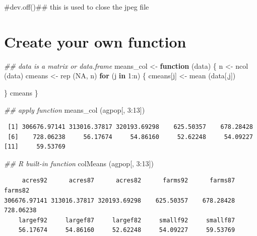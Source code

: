 \documentclass[
  letterpaper,
]{scrbook}
\newenvironment{Shaded}{\begin{snugshade}}{\end{snugshade}}
\newcommand{\CommentTok}[1]{\textcolor[rgb]{0.37,0.37,0.37}{#1}}
\newcommand{\ConstantTok}[1]{\textcolor[rgb]{0.56,0.35,0.01}{#1}}
\newcommand{\ControlFlowTok}[1]{\textcolor[rgb]{0.00,0.23,0.31}{\textbf{#1}}}
\newcommand{\DecValTok}[1]{\textcolor[rgb]{0.68,0.00,0.00}{#1}}
\newcommand{\DocumentationTok}[1]{\textcolor[rgb]{0.37,0.37,0.37}{\textit{#1}}}
\newcommand{\FunctionTok}[1]{\textcolor[rgb]{0.28,0.35,0.67}{#1}}
\newcommand{\NormalTok}[1]{\textcolor[rgb]{0.00,0.23,0.31}{#1}}
\newcommand{\OtherTok}[1]{\textcolor[rgb]{0.00,0.23,0.31}{#1}}
\newcommand{\SpecialCharTok}[1]{\textcolor[rgb]{0.37,0.37,0.37}{#1}}
\begin{document}
\begin{Shaded}
\begin{Highlighting}[]
\CommentTok{\#dev.off()\#\# this is used to close the jpeg file}
\end{Highlighting}
\end{Shaded}

\section{Create your own function}\label{create-your-own-function}

\begin{Shaded}
\begin{Highlighting}[]
\DocumentationTok{\#\# data is a matrix or data.frame}
\NormalTok{means\_col }\OtherTok{\textless{}{-}} \ControlFlowTok{function}\NormalTok{ (data)}
\NormalTok{\{}
\NormalTok{    n }\OtherTok{\textless{}{-}} \FunctionTok{ncol}\NormalTok{ (data)}
\NormalTok{    cmeans }\OtherTok{\textless{}{-}} \FunctionTok{rep}\NormalTok{ (}\ConstantTok{NA}\NormalTok{, n)}
    \ControlFlowTok{for}\NormalTok{ (j }\ControlFlowTok{in} \DecValTok{1}\SpecialCharTok{:}\NormalTok{n)}
\NormalTok{    \{}
\NormalTok{        cmeans[j] }\OtherTok{\textless{}{-}} \FunctionTok{mean}\NormalTok{ (data[,j])}
        
\NormalTok{    \}}
\NormalTok{    cmeans}
\NormalTok{\}}

\DocumentationTok{\#\# apply function}
\FunctionTok{means\_col}\NormalTok{ (agpop[, }\DecValTok{3}\SpecialCharTok{:}\DecValTok{13}\NormalTok{])}
\end{Highlighting}
\end{Shaded}

\begin{verbatim}
 [1] 306676.97141 313016.37817 320193.69298    625.50357    678.28428
 [6]    728.06238     56.17674     54.86160     52.62248     54.09227
[11]     59.53769
\end{verbatim}

\begin{Shaded}
\begin{Highlighting}[]
\DocumentationTok{\#\# R built{-}in function}
\FunctionTok{colMeans}\NormalTok{ (agpop[, }\DecValTok{3}\SpecialCharTok{:}\DecValTok{13}\NormalTok{])}
\end{Highlighting}
\end{Shaded}

\begin{verbatim}
     acres92      acres87      acres82      farms92      farms87      farms82 
306676.97141 313016.37817 320193.69298    625.50357    678.28428    728.06238 
    largef92     largef87     largef82     smallf92     smallf87 
    56.17674     54.86160     52.62248     54.09227     59.53769 
\end{verbatim}
\end{document}
